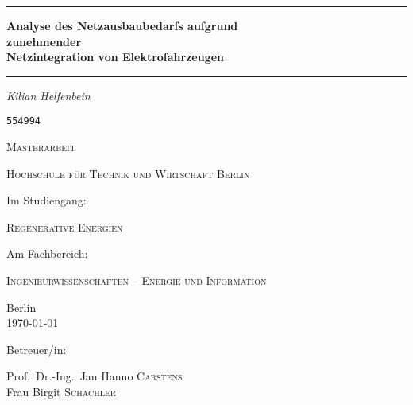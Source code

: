 \begin{titlepage}
	\centering
	\par\noindent\rule{\textwidth}{0.4pt}
	{\huge\bfseries Analyse des Netzausbaubedarfs aufgrund\\
	zunehmender\\
	Netzintegration von Elektrofahrzeugen\par}
	\par\noindent\rule{\textwidth}{0.4pt}\par
	\vspace*{2cm}
	{\Large\itshape Kilian Helfenbein\par}
	{\Large \texttt{554994}\par}
	\vspace{1.5cm}
	{\scshape\Large Masterarbeit\par}
	\vspace{1.5cm}
	{\scshape\LARGE Hochschule für Technik und Wirtschaft Berlin \par}
	\vspace{1cm}
	Im Studiengang:\par
	{\scshape\large Regenerative Energien\par}
	\vspace{.5cm}
	Am Fachbereich:\par
	{\scshape\large Ingenieurwissenschaften {--} Energie und Information\par}
	\vfill
	{\large Berlin\\
	\today\par}
	\vfill
	Betreuer/in:\par
	Prof.~Dr.-Ing.~Jan Hanno \textsc{Carstens}\\
	Frau Birgit \textsc{Schachler}
\end{titlepage}